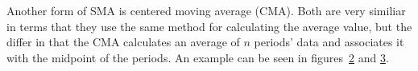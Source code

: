 \begin{figure}[ht]
	\caption{}
	\label{fig:smaGraph}
\end{figure}

Another form of SMA is centered moving average (CMA). Both are very similiar in terms that they use the same method for calculating the average value, but the differ in that the CMA calculates an average of $n$ periods' data and associates it with the midpoint of the periods. An example can be seen in figures~\ref{fig:cmaTable} and \ref{fig:cmaGraph}.

\begin{figure}[ht]
	\caption{}
	\label{fig:cmaTable}
\end{figure}

\begin{figure}[ht]
	\caption{}
	\label{fig:cmaGraph}
\end{figure}

